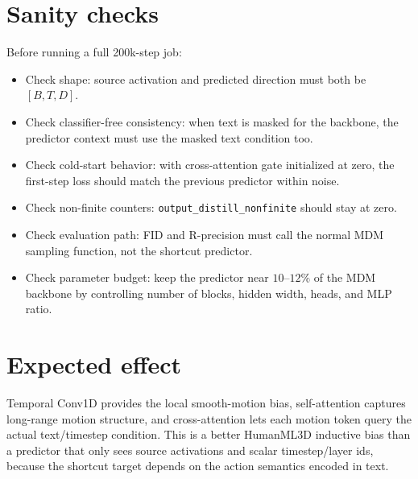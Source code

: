 \documentclass[11pt]{article}
\begin{document}
\section{Sanity checks}

Before running a full 200k-step job:

\begin{itemize}
\item Check shape: source activation and predicted direction must both be
  $[B,T,D]$.
\item Check classifier-free consistency: when text is masked for the backbone,
  the predictor context must use the masked text condition too.
\item Check cold-start behavior: with cross-attention gate initialized at zero,
  the first-step loss should match the previous predictor within noise.
\item Check non-finite counters: \texttt{output\_distill\_nonfinite} should stay
  at zero.
\item Check evaluation path: FID and R-precision must call the normal MDM
  sampling function, not the shortcut predictor.
\item Check parameter budget: keep the predictor near $10$--$12\%$ of the MDM
  backbone by controlling number of blocks, hidden width, heads, and MLP ratio.
\end{itemize}

\section{Expected effect}

Temporal Conv1D provides the local smooth-motion bias, self-attention captures
long-range motion structure, and cross-attention lets each motion token query
the actual text/timestep condition. This is a better HumanML3D inductive bias
than a predictor that only sees source activations and scalar timestep/layer
ids, because the shortcut target depends on the action semantics encoded in
text.
\end{document}
